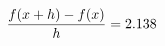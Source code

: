 \documentclass[preview]{standalone}
\begin{document}
\begin{align*}
\special{dvisvgm:raw <g id='unique000'>}\frac{f(x+h)-f(x)}{h} = 2.138\special{dvisvgm:raw </g>}
\end{align*}
\end{document}
